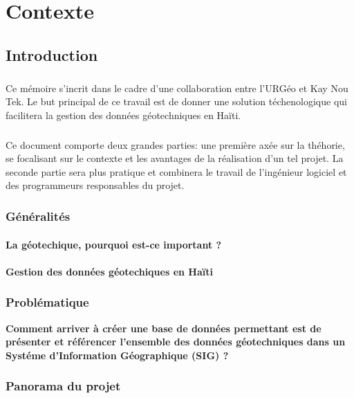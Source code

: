 \chapter{Contexte}
\section{Introduction}
    \paragraph{}
    Ce mémoire s'incrit dans le cadre d'une collaboration entre
    l'URGéo et Kay Nou Tek. Le but principal de ce travail est
    de donner une solution téchenologique  qui facilitera la 
    gestion des données géotechniques en Haïti.
    \paragraph{}
    Ce document comporte deux grandes parties: une première axée
    sur la théhorie, se focalisant sur le contexte et les avantages
    de la réalisation d'un tel projet. La seconde partie sera plus pratique
    et combinera le travail de l'ingénieur logiciel et des programmeurs responsables
    du projet.
    \subsection{Généralités}
        \subsubsection{La géotechique, pourquoi est-ce important ?}
          
        \subsubsection{Gestion des données géotechiques en Haïti}
            

    \subsection{Problématique}
    \textbf{Comment arriver à créer une base de données permettant est de 
    présenter et référencer l'ensemble des données géotechniques dans un Systéme
    d’Information Géographique (SIG) ?}

    \subsection{Panorama du projet}
        

